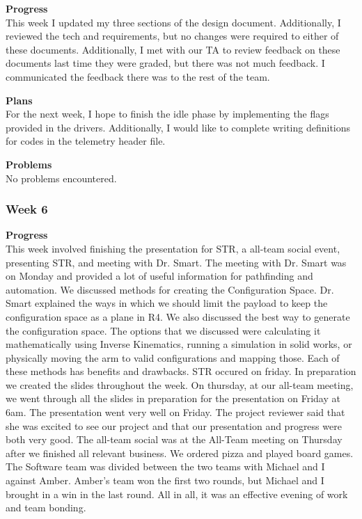 \textbf{Progress} \\
This week I updated my three sections of the design document. Additionally, I 
reviewed the tech and requirements, but no changes were required to either of 
these documents. Additionally, I met with our TA to review feedback on these 
documents last time they were graded, but there was not much feedback. I 
communicated the feedback there was to the rest of the team.

\textbf{Plans} \\
For the next week, I hope to finish the idle phase by implementing the flags 
provided in the drivers. Additionally, I would like to complete writing 
definitions for codes in the telemetry header file.

\textbf{Problems} \\
No problems encountered.

\subsubsection{Week 6}
\textbf{Progress} \\ 
This week involved finishing the presentation for STR, a all-team social event, presenting STR, and meeting with Dr. Smart. The meeting with Dr. Smart was on Monday and provided a lot of useful information for pathfinding and automation. We discussed methods for creating the Configuration Space. Dr. Smart explained the ways in which we should limit the payload to keep the configuration space as a plane in R4. We also discussed the best way to generate the configuration space. The options that we discussed were calculating it mathematically using Inverse Kinematics, running a simulation in solid works, or physically moving the arm to valid configurations and mapping those. Each of these methods has benefits and drawbacks. STR occured on friday. In preparation we created the slides throughout the week. On thursday, at our all-team meeting, we went through all the slides in preparation for the presentation on Friday at 6am. The presentation went very well on Friday. The project reviewer said that she was excited to see our project and that our presentation and progress were both very good. The all-team social was at the All-Team meeting on Thursday after we finished all relevant business. We ordered pizza and played board games. The Software team was divided between the two teams with Michael and I against Amber. Amber's team won the first two rounds, but Michael and I brought in a win in the last round. All in all, it was an effective evening of work and team bonding.


